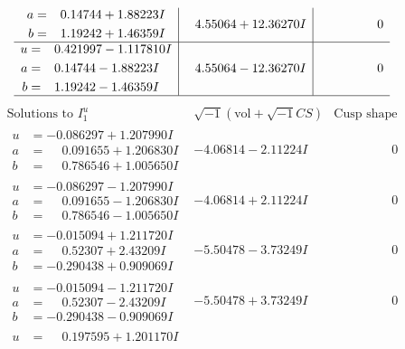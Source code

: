 \documentclass[1p]{elsarticle_modified}
\theoremstyle{definition}
\newcommand{\I}{\sqrt{-1}}
\begin{document}
$$\begin{array}{c|c|c}
\begin{aligned}
a &= \phantom{-}0.14744 + 1.88223 I \\
b &= \phantom{-}1.19242 + 1.46359 I\end{aligned}
 & \phantom{-}4.55064 + 12.36270 I & \phantom{-0.000000 } 0 \\ \hline\begin{aligned}
u &= \phantom{-}0.421997 - 1.117810 I \\
a &= \phantom{-}0.14744 - 1.88223 I \\
b &= \phantom{-}1.19242 - 1.46359 I\end{aligned}
 & \phantom{-}4.55064 - 12.36270 I & \phantom{-0.000000 } 0\\
 \hline 
 \end{array}$$\newpage$$\begin{array}{c|c|c}  
\text{Solutions to }I^u_{1}& \I (\text{vol} + \sqrt{-1}CS) & \text{Cusp shape}\\
 \hline 
\begin{aligned}
u &= -0.086297 + 1.207990 I \\
a &= \phantom{-}0.091655 + 1.206830 I \\
b &= \phantom{-}0.786546 + 1.005650 I\end{aligned}
 & -4.06814 - 2.11224 I & \phantom{-0.000000 } 0 \\ \hline\begin{aligned}
u &= -0.086297 - 1.207990 I \\
a &= \phantom{-}0.091655 - 1.206830 I \\
b &= \phantom{-}0.786546 - 1.005650 I\end{aligned}
 & -4.06814 + 2.11224 I & \phantom{-0.000000 } 0 \\ \hline\begin{aligned}
u &= -0.015094 + 1.211720 I \\
a &= \phantom{-}0.52307 + 2.43209 I \\
b &= -0.290438 + 0.909069 I\end{aligned}
 & -5.50478 - 3.73249 I & \phantom{-0.000000 } 0 \\ \hline\begin{aligned}
u &= -0.015094 - 1.211720 I \\
a &= \phantom{-}0.52307 - 2.43209 I \\
b &= -0.290438 - 0.909069 I\end{aligned}
 & -5.50478 + 3.73249 I & \phantom{-0.000000 } 0 \\ \hline\begin{aligned}
u &= \phantom{-}0.197595 + 1.201170 I \\

\end{aligned}
\end{array}$$
\end{document}
